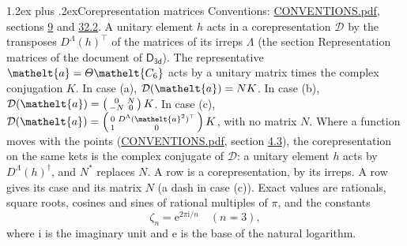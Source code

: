 \documentclass[10pt,a4paper]{article}
\makeatletter
\renewcommand\section{\@startsection{section}{1}{\z@}{-3ex plus -1ex minus -.2ex}%
  {1.2ex plus .2ex}{\normalfont\large\sffamily\bfseries\color{parttitle}}}
\numberwithin{equation}{section}
\newcommand{\eltfont}[1]{{\let\sigma\eltsigma\mathelt{#1}}}
\newcommand{\grp}[1]{\mathsf{#1}}
\newcommand{\elt}[1]{\eltfont{#1}}
\newcommand{\iunit}{\mathrm{i}}
\newcommand{\expe}{\mathrm{e}}
\newcommand{\rootunity}[1]{\zeta_{#1}}
\makeatother
\begin{document}
\section{Corepresentation matrices}\label{s:corep_matrices}
Conventions: \href{../../CONVENTIONS.pdf}{CONVENTIONS.pdf}, sections \href{../../../rotation/CONVENTIONS.pdf\#conv.9}{9} and \href{../../CONVENTIONS.pdf\#conv.32.2}{32.2}.
A unitary element $h$ acts in a corepresentation $\mathcal{D}$ by the transposes $D^{\Lambda}(h)^{\top}$ of the matrices of its irreps $\Lambda$ (the section Representation matrices of the document of \href{../../../rotation/data/pdf/D3d.pdf}{$\grp{D_{3d}}$}). The representative $\elt{a} = \varTheta\elt{C_{6}}$ acts by a unitary matrix times the complex conjugation $K$.
In case (a), $\mathcal{D}(\elt{a}) = NK$. In case (b), $\mathcal{D}(\elt{a}) = \left(\begin{smallmatrix} 0 & N \\ -N & 0 \end{smallmatrix}\right) K$. In case (c), $\mathcal{D}(\elt{a}) = \left(\begin{smallmatrix} 0 & D^{\Lambda}(\elt{a}^2)^{\top} \\ 1 & 0 \end{smallmatrix}\right) K$, with no matrix $N$.
Where a function moves with the points (\href{../../CONVENTIONS.pdf}{CONVENTIONS.pdf}, section \href{../../../rotation/CONVENTIONS.pdf\#conv.4.3}{4.3}), the corepresentation on the same kets is the complex conjugate of $\mathcal{D}$: a unitary element $h$ acts by $D^{\Lambda}(h)^{\dagger}$, and $N^{*}$ replaces $N$.
A row is a corepresentation, by its irreps. A row gives its case and its matrix $N$ (a dash in case (c)).
\leavevmode\label{n:constant.root}\label{n:index.root.order}Exact values are rationals, square roots, cosines and sines of rational multiples of $\pi$, and the constants
\begin{equation}\label{e:constants}\rootunity{n} = \expe^{2\pi\iunit/n}\quad(n = 3),\end{equation}
where $\iunit$ is the imaginary unit and $\expe$ is the base of the natural logarithm.
\end{document}
